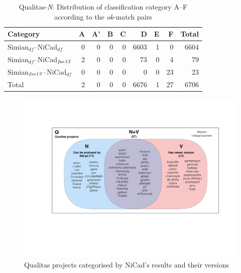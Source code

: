 \documentclass{IEEEtran}
\begin{document}

\begin{table}[H]
	\centering
	\caption{Qualitas-\textit{N}: Distribution of classification category A--F  according to the \textit{ok}-match pairs}
	\label{tab:ok_classification_new}
	\begin{tabular}{|l|r|r|r|r|r|r|r|r|}
		\hline 
		Category   																										& A   	& 	A' 	& 	B  & C	   & D   	&	E   &	F   & Total  \\
		\hline
		Simian$_{df}$--NiCad$_{df}$ & 0 & 0	& 0 & 0 & 6603 & 1 & 0 & 6604 \\
		Simian$_{df}$--NiCad$_{\textrm{\textit{fse13}}}$ 
		& 2 	& 0 	& 0 	& 0 	& 73 	 & 0 	  & 4 		&  79 \\
		Simian$_{\textrm{\textit{fse13}}}$--NiCad$_{df}$   									
		& 0 	& 0 	& 0 	& 0 	 & 0 	  & 0 		& 23 	& 23 \\
		\hline
		Total   & 2  	&   0   & 0   	&  0   &   6676   &   1   & 27  & 6706 \\
		\hline
	\end{tabular} 
\end{table}

\begin{figure}
	\centering
	\includegraphics[width=0.7\linewidth]{n+v}
	\caption{Qualitas projects categorised by NiCad's results and their versions}
	\label{fig:n+v}
\end{figure}
\end{document}
